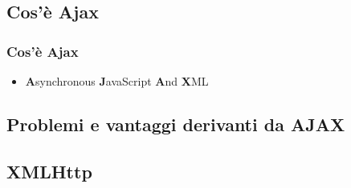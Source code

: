 \documentclass{beamer}
\begin{document}
\subsection{Cos'è Ajax}

\begin{frame}
    \frametitle{Cos'è Ajax}
    \begin{itemize}
    \item \textbf{A}synchronous \textbf{J}avaScript \textbf{A}nd \textbf{X}ML
    \end{itemize}

\end{frame}

\subsection{Problemi e vantaggi derivanti da AJAX}
\subsection{XMLHttp} 
\end{document}
